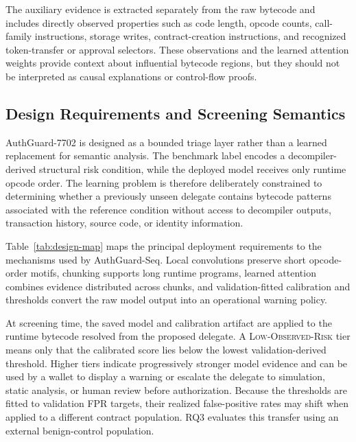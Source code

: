 \documentclass[conference]{IEEEtran}
\begin{document}
The auxiliary evidence is extracted separately from the raw bytecode and includes directly observed properties such as code length, opcode counts, call-family instructions, storage writes, contract-creation instructions, and recognized token-transfer or approval selectors. These observations and the learned attention weights provide context about influential bytecode regions, but they should not be interpreted as causal explanations or control-flow proofs.

\subsection{Design Requirements and Screening Semantics}

AuthGuard-7702 is designed as a bounded triage layer rather than a learned replacement for semantic analysis. The benchmark label encodes a decompiler-derived structural risk condition, while the deployed model receives only runtime opcode order. The learning problem is therefore deliberately constrained to determining whether a previously unseen delegate contains bytecode patterns associated with the reference condition without access to decompiler outputs, transaction history, source code, or identity information.

Table~\ref{tab:design-map} maps the principal deployment requirements to the mechanisms used by AuthGuard-Seq. Local convolutions preserve short opcode-order motifs, chunking supports long runtime programs, learned attention combines evidence distributed across chunks, and validation-fitted calibration and thresholds convert the raw model output into an operational warning policy.



At screening time, the saved model and calibration artifact are applied to the runtime bytecode resolved from the proposed delegate. A \textsc{Low-Observed-Risk} tier means only that the calibrated score lies below the lowest validation-derived threshold.  Higher tiers indicate progressively stronger model evidence and can be used by a wallet to display a warning or escalate the delegate to simulation, static analysis, or human review before authorization. Because the thresholds are fitted to validation FPR targets, their realized false-positive rates may shift when applied to a different contract population. RQ3 evaluates this transfer using an external benign-control population.
\end{document}
